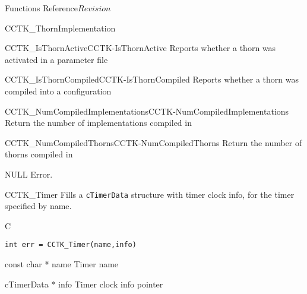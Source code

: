 \begin{cactuspart}{ Functions Reference}{}{$Revision$}
\begin{FunctionDescription}{CCTK\_ThornImplementation}
\begin{SeeAlsoSection}
\begin{SeeAlso2}{CCTK\_IsThornActive}{CCTK-IsThornActive}
  Reports whether a thorn was activated in a parameter file
\end{SeeAlso2}
\begin{SeeAlso2}{CCTK\_IsThornCompiled}{CCTK-IsThornCompiled}
  Reports whether a thorn was compiled into a configuration
\end{SeeAlso2}
\begin{SeeAlso2}{CCTK\_NumCompiledImplementations}{CCTK-NumCompiledImplementations}
  Return the number of implementations compiled in
\end{SeeAlso2}
\begin{SeeAlso2}{CCTK\_NumCompiledThorns}{CCTK-NumCompiledThorns}
  Return the number of thorns compiled in
\end{SeeAlso2}
\end{SeeAlsoSection}

\begin{ErrorSection}
\begin{Error}{NULL}
Error.
\end{Error}
\end{ErrorSection}

\end{FunctionDescription}



\begin{FunctionDescription}{CCTK\_Timer}
\label{CCTK-Timer}
Fills a {\tt cTimerData}
structure with timer clock info, for the timer specified by name.
\begin{SynopsisSection}
\begin{Synopsis}{C}
\begin{verbatim}
int err = CCTK_Timer(name,info)
\end{verbatim}
\end{Synopsis}
\end{SynopsisSection}

\begin{ParameterSection}
\begin{Parameter} {const char * name}
Timer name
\end{Parameter}

\begin{Parameter} {cTimerData * info}
Timer clock info pointer
\end{Parameter}
\end{ParameterSection}


\end{FunctionDescription}
\end{cactuspart}
